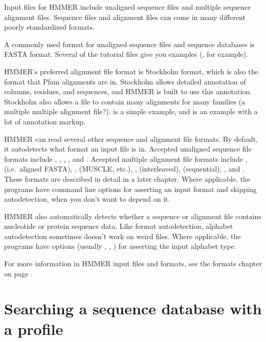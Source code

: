 Input files for HMMER include unaligned sequence files and multiple
sequence alignment files. Sequence files and alignment files can come
in many different poorly standardized formats.

A commonly used format for unaligned sequence files and sequence
databases is FASTA format. Several of the tutorial files give you
examples (, for example).

HMMER's preferred alignment file format is Stockholm format, which is
also the format that Pfam alignments are in.  Stockholm allows
detailed annotation of columns, residues, and sequences, and HMMER is
built to use this annotation. Stockholm also
allows a file to contain many alignments for many families (a multiple
multiple alignment file?).  is a simple example,
and  is an example with a lot of annotation markup.

HMMER can read several other sequence and alignment file formats. By
default, it autodetects what format an input file is in.  Accepted
unaligned sequence file formats include , ,
, , and . Accepted multiple
alignment file formats include , 
(i.e.\ aligned FASTA), ,  (MUSCLE,
etc.), ,  (interleaved), 
(sequential), , and . These formats are
described in detail in a later chapter. Where applicable, the programs
have command line options for asserting an input format and skipping
autodetection, when you don't want to depend on it.

HMMER also automatically detects whether a sequence or alignment file
contains nucleotide or protein sequence data. Like format
autodetection, alphabet autodetection sometimes doesn't work on weird
files. Where applicable, the programs have options (usually
, , ) for asserting the
input alphabet type.

For more information in HMMER input files and formats, see the formats
chapter on page \pageref{chapter:formats}.
 

\section{Searching a sequence database with a profile}

